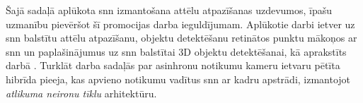 Šajā sadaļā aplūkota \Gls{snn} izmantošana attēlu atpazīšanas uzdevumos, īpašu uzmanību pievēršot šī promocijas darba
ieguldījumam. Aplūkotie darbi ietver uz \Gls{snn} balstītu attēlu atpazīšanu, objektu detektēšanu retinātos punktu mākoņos ar
\Gls{snn} \cite{lielamurs2024} un paplašinājumus uz \Gls{snn} balstītai 3D objektu detektēšanai, kā aprakstīts darbā
\cite{lielamurs2025}. Turklāt darba \cite{druml2025} sadaļās par asinhronu notikumu kameru ietvaru pētīta hibrīda pieeja, kas
apvieno notikumu vadītus \Gls{snn} ar kadru apstrādi, izmantojot \textit{atlikuma neironu tīklu}  arhitektūru.
